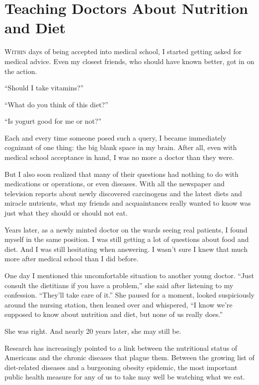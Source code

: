 ﻿\documentclass[12pt]{article}
\begin{document}
\pagebreak
\section{Teaching Doctors About Nutrition and Diet}

\lettrine{W}{ithin} days of being accepted into medical school, I started
getting asked for medical advice. Even my closest friends, who should have known better, got in on
the action.

``Should I take vitamins?''

``What do you think of this diet?''

``Is yogurt good for me or not?''

Each and every time someone posed such a query, I became immediately cognizant of one thing: the big
blank space in my brain. After all, even with medical school acceptance in hand, I was no more a
doctor than they were.

But I also soon realized that many of their questions had nothing to do with medications or
operations, or even diseases. With all the newspaper and television reports about newly discovered
carcinogens and the latest diets and miracle nutrients, what my friends and acquaintances really
wanted to know was just what they should or should not eat.

Years later, as a newly minted doctor on the wards seeing real patients, I found myself in the same
position. I was still getting a lot of questions about food and diet. And I was still hesitating
when answering. I wasn't sure I knew that much more after medical school than I did before.

One day I mentioned this uncomfortable situation to another young doctor. ``Just consult the
dietitians if you have a problem,'' she said after listening to my confession. ``They'll take care
of it.'' She paused for a moment, looked suspiciously around the nursing station, then leaned over
and whispered, ``I know we're supposed to know about nutrition and diet, but none of us really
does.''

She was right. And nearly 20 years later, she may still be.

Research has increasingly pointed to a link between the nutritional status of Americans and the
chronic diseases that plague them. Between the growing list of diet-related diseases and a
burgeoning obesity epidemic, the most important public health measure for any of us to take may well
be watching what we eat.
\end{document}

